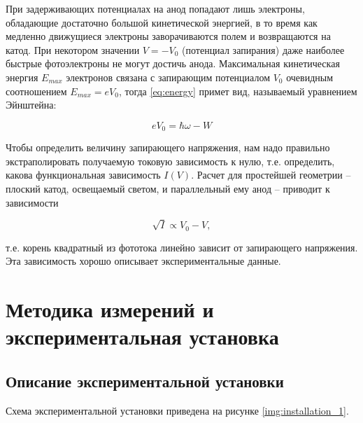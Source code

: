 \documentclass[a4paper, 12pt]{article}
\begin{document}
	При задерживающих потенциалах на анод попадают лишь электроны,
	обладающие достаточно большой кинетической энергией, в то время как медленно движущиеся электроны заворачиваются полем и возвращаются на катод. При некотором значении $V = -V_0$ (потенциал запирания) даже наиболее быстрые фотоэлектроны не могут достичь анода. Максимальная кинетическая энергия $E_{max}$ электронов связана с запирающим потенциалом $V_0$ очевидным соотношением $E_{max} = eV_0$, тогда \eqref{eq:energy} примет вид, называемый уравнением Эйнштейна:
	
	\begin{equation}
        \label{eq:Einsteain}
        eV_0 = \hbar\omega - W 
	\end{equation}
	
	Чтобы определить величину запирающего
	напряжения, нам надо правильно экстраполировать получаемую токовую зависимость к нулю, т.е. определить, какова функциональная зависимость $I(V)$. Расчет для простейшей геометрии -- плоский катод, освещаемый светом, и параллельный ему анод -- приводит к зависимости
	
	\begin{equation}
        \sqrt{I} \propto V_0 - V,
	\end{equation}
	
	т.е. корень квадратный из фототока линейно
	зависит от запирающего напряжения. Эта зависимость хорошо описывает экспериментальные данные.
    
    \newpage
    
    \section{Методика измерений и экспериментальная установка}

    \subsection{Описание экспериментальной установки}

    Схема экспериментальной установки приведена на рисунке \ref{img:installation_1}.
    
\end{document}
